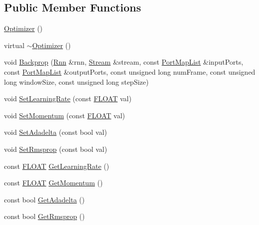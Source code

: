 \subsection*{Public Member Functions}
\begin{DoxyCompactItemize}
\item 
\hyperlink{classfractal_1_1Optimizer_af23260ba20d8d818a0a0e4366ef9f0db}{Optimizer} ()
\item 
virtual \hyperlink{classfractal_1_1Optimizer_a48177000c5ae0bc136fad98d603bc13c}{$\sim$\+Optimizer} ()
\item 
void \hyperlink{classfractal_1_1Optimizer_a64b16b4d1cf533253a137a2bb6744b53}{Backprop} (\hyperlink{classfractal_1_1Rnn}{Rnn} \&rnn, \hyperlink{classfractal_1_1Stream}{Stream} \&stream, const \hyperlink{namespacefractal_a9697dee0746adccf37331470de749c2b}{Port\+Map\+List} \&input\+Ports, const \hyperlink{namespacefractal_a9697dee0746adccf37331470de749c2b}{Port\+Map\+List} \&output\+Ports, const unsigned long num\+Frame, const unsigned long window\+Size, const unsigned long step\+Size)
\item 
void \hyperlink{classfractal_1_1Optimizer_a60c57187720ea8f6af8ad18cc907701a}{Set\+Learning\+Rate} (const \hyperlink{namespacefractal_a1c2d2530689575d5ccb56bae52af70d3}{F\+L\+O\+A\+T} val)
\item 
void \hyperlink{classfractal_1_1Optimizer_aa1cb73be3f71b75d1414517c34ed0a64}{Set\+Momentum} (const \hyperlink{namespacefractal_a1c2d2530689575d5ccb56bae52af70d3}{F\+L\+O\+A\+T} val)
\item 
void \hyperlink{classfractal_1_1Optimizer_ad67cbee80ee6c2ec5fe1dd4b41f9afa1}{Set\+Adadelta} (const bool val)
\item 
void \hyperlink{classfractal_1_1Optimizer_a51246a85425060de9119af6696e391dc}{Set\+Rmsprop} (const bool val)
\item 
const \hyperlink{namespacefractal_a1c2d2530689575d5ccb56bae52af70d3}{F\+L\+O\+A\+T} \hyperlink{classfractal_1_1Optimizer_a25e1255267cdf33453cfc723cda8dcd5}{Get\+Learning\+Rate} ()
\item 
const \hyperlink{namespacefractal_a1c2d2530689575d5ccb56bae52af70d3}{F\+L\+O\+A\+T} \hyperlink{classfractal_1_1Optimizer_a807884a97e313edc918c3a386ea4b676}{Get\+Momentum} ()
\item 
const bool \hyperlink{classfractal_1_1Optimizer_adbedaa0d2cc9f2a9a288f420829f5fd8}{Get\+Adadelta} ()
\item 
const bool \hyperlink{classfractal_1_1Optimizer_a8c082e46d0383817425e809c79d659e7}{Get\+Rmsprop} ()
\end{DoxyCompactItemize}
